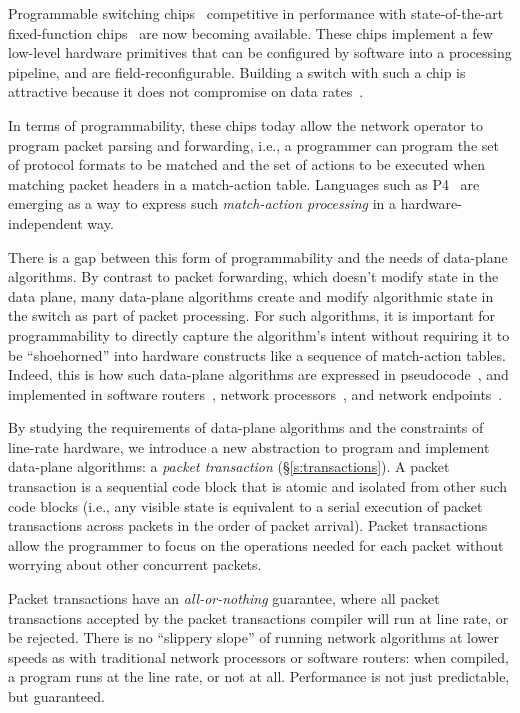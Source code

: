 Programmable switching chips~\cite{flexpipe, xpliant, tofino} competitive in
performance with state-of-the-art fixed-function chips~\cite{trident,
tomahawk, mellanox} are now becoming available. These chips implement a few
low-level hardware primitives that can be configured by software into a
processing pipeline, and are field-reconfigurable. Building a switch with such
a chip is attractive because it does not compromise on data rates~\cite{rmt}.

In terms of programmability, these chips today allow the network operator to
program packet parsing and forwarding, i.e., a programmer can program the set
of protocol formats to be matched and the set of actions to be executed when
matching packet headers in a match-action table. Languages such as P4~\cite{p4}
are emerging as a way to express such {\em match-action processing} in a
hardware-independent way.

There is a gap between this form of programmability and the needs of data-plane
algorithms. By contrast to packet forwarding, which doesn't modify state in the
data plane, many data-plane algorithms create and modify algorithmic state in
the switch as part of packet processing.  For such algorithms, it is important
for programmability to directly capture the algorithm's intent without
requiring it to be ``shoehorned'' into hardware constructs like a sequence of
match-action tables. Indeed, this is how such data-plane algorithms are
expressed in pseudocode~\cite{red, codel_code}, and implemented in software
routers~\cite{click}, network processors~\cite{packetc}, and network
endpoints~\cite{qdisc}.

By studying the requirements of data-plane algorithms and the constraints of
line-rate hardware, we introduce a new abstraction to program and implement
data-plane algorithms: a {\em packet transaction} (\S\ref{s:transactions}). A
packet transaction is a sequential code block that is atomic and isolated from
other such code blocks (i.e., any visible state is equivalent to a serial
execution of packet transactions across packets in the order of packet
arrival).  Packet transactions allow the programmer to focus on the operations
needed for each packet without worrying about other concurrent packets.

Packet transactions have an \textit{all-or-nothing} guarantee, where all packet
transactions accepted by the packet transactions compiler will run at line
rate, or be rejected. There is no ``slippery slope'' of running network
algorithms at lower speeds as with traditional network processors or software
routers: when compiled, a \pktlanguage program runs at the line rate, or not at
all.  Performance is not just predictable, but guaranteed.

